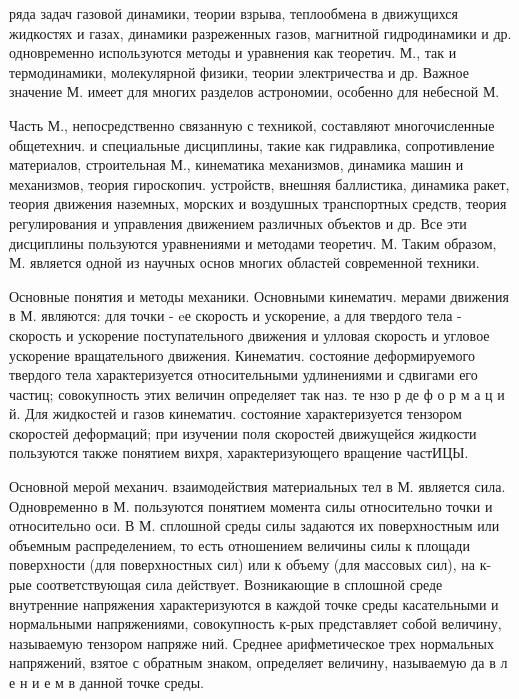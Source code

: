 \documentclass[10pt]{article}
\begin{document}
ряда задач газовой динамики, теории взрыва, теплообмена в движущихся жидкостях и газах, динамики разреженных газов, магнитной гидродинамики и др. одновременно используются методы и уравнения как теоретич. М., так и термодинамики, молекулярной физики, теории электричества и др. Важное значение М. имеет для многих разделов астрономии, особенно для небесной М.



Часть М., непосредственно связанную с техникой, составляют многочисленные общетехнич. и специальные дисциплины, такие как гидравлика, сопротивление материалов, строительная М., кинематика механизмов, динамика машин и механизмов, теория гироскопич. устройств, внешняя баллистика, динамика ракет, теория движения наземных, морских и воздушных транспортных средств, теория регулирования и управления движением различных объектов и др. Все эти дисциплины пользуются уравнениями и методами теоретич. М. Таким образом, М. является одной из научных основ многих областей современной техники.



Основные понятия и методы механики. Основными кинематич. мерами движения в М. являются: для точки - eе скорость и ускорение, а для твердого тела - скорость и ускорение поступательного движения и улловая скорость и угловое ускорение вращательного движения. Кинематич. состояние деформируемого твердого тела характеризуется относительными удлинениями и сдвигами его частиц; совокупность этих величин определяет так наз. те нзо р де ф о р м а ц и й. Для жидкостей и газов кинематич. состояние характеризуется тензором скоростей деформаций; при изучении поля скоростей движущейся жидкости пользуются также понятием вихря, характеризующего вращение частИЦЫ.



Основной мерой механич. взаимодействия материальных тел в М. является сила. Одновременно в М. пользуются понятием момента силы относительно точки и относительно оси. В М. сплошной среды силы задаются их поверхностным или объемным распределением, то есть отношением величины силы к площади поверхности (для поверхностных сил) или к объему (для массовых сил), на к-рые соответствующая сила действует. Возникающие в сплошной среде внутренние напряжения характеризуются в каждой точке среды касательными и нормальными напряжениями, совокупность к-рых представляет собой величину, называемую тензором напряже ний. Среднее арифметическое трех нормальных напряжений, взятое с обратным знаком, определяет величину, называемую да в л е н и е м в данной точке среды.
\end{document}
